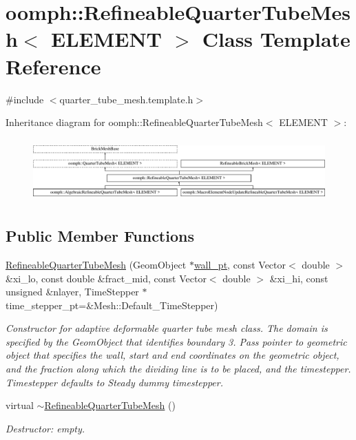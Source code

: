 \hypertarget{classoomph_1_1RefineableQuarterTubeMesh}{}\section{oomph\+:\+:Refineable\+Quarter\+Tube\+Mesh$<$ E\+L\+E\+M\+E\+NT $>$ Class Template Reference}
\label{classoomph_1_1RefineableQuarterTubeMesh}


{\ttfamily \#include $<$quarter\+\_\+tube\+\_\+mesh.\+template.\+h$>$}

Inheritance diagram for oomph\+:\+:Refineable\+Quarter\+Tube\+Mesh$<$ E\+L\+E\+M\+E\+NT $>$\+:\begin{figure}[H]
\begin{center}
\leavevmode
\includegraphics[height=2.445415cm]{classoomph_1_1RefineableQuarterTubeMesh}
\end{center}
\end{figure}
\subsection*{Public Member Functions}
\begin{DoxyCompactItemize}
\item 
\hyperlink{classoomph_1_1RefineableQuarterTubeMesh_a8aaace5bc465614ace0a9117b3ee169c}{Refineable\+Quarter\+Tube\+Mesh} (Geom\+Object $\ast$\hyperlink{classoomph_1_1QuarterTubeMesh_af59c4cde343ddd76caea4bc8c8ad8b94}{wall\+\_\+pt}, const Vector$<$ double $>$ \&xi\+\_\+lo, const double \&fract\+\_\+mid, const Vector$<$ double $>$ \&xi\+\_\+hi, const unsigned \&nlayer, Time\+Stepper $\ast$time\+\_\+stepper\+\_\+pt=\&Mesh\+::\+Default\+\_\+\+Time\+Stepper)
\begin{DoxyCompactList}\small\item\em Constructor for adaptive deformable quarter tube mesh class. The domain is specified by the Geom\+Object that identifies boundary 3. Pass pointer to geometric object that specifies the wall, start and end coordinates on the geometric object, and the fraction along which the dividing line is to be placed, and the timestepper. Timestepper defaults to Steady dummy timestepper. \end{DoxyCompactList}\item 
virtual \hyperlink{classoomph_1_1RefineableQuarterTubeMesh_a229ad0335ba60176c578897b558790eb}{$\sim$\+Refineable\+Quarter\+Tube\+Mesh} ()
\begin{DoxyCompactList}\small\item\em Destructor\+: empty. \end{DoxyCompactList}\end{DoxyCompactItemize}
